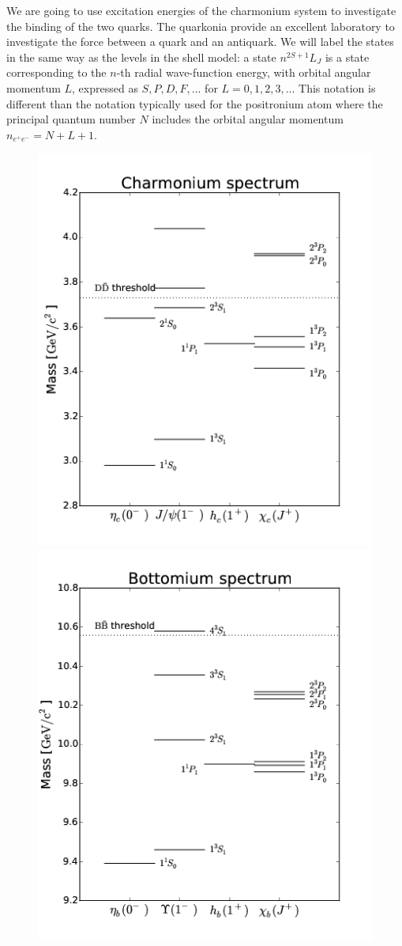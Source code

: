 \documentclass[12pt]{article}
\begin{document}
We are going to use excitation energies of the charmonium system to investigate the binding of the two quarks. The quarkonia provide an excellent laboratory to investigate the force between a quark and an antiquark. We will label the states in the same way as the levels in the shell model: a state $n^{2S+1}L_J$ is a state corresponding to the $n$-th radial wave-function energy, with orbital angular momentum $L$, expressed as $S,P,D,F,...$ for $L=0,1,2,3,...$ This notation is different than the notation typically used for the positronium atom where the principal quantum number $N$ includes the orbital angular momentum $n_{e^+e^-}=N+L+1$.
\begin{figure}
\begin{center} 
\includegraphics[scale=0.5]{images/Charmonium.png}
\includegraphics[scale=0.5]{images/Bottomium.png}

\end{center}
\end{figure}
\end{document}
